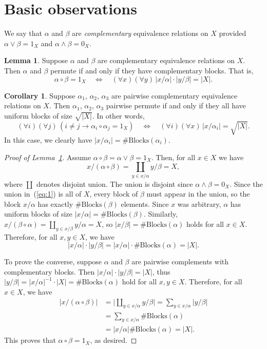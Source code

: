 \documentclass{amsart}
\theoremstyle{plain}
\theoremstyle{definition}
\newtheorem{corollary}{Corollary}
\newtheorem{lemma}{Lemma}
\theoremstyle{definition}
\numberwithin{equation}{section}
\newcommand{\<}{\ensuremath{\langle}}
\renewcommand{\>}{\ensuremath{\rangle}}
\newcommand{\meet}{\ensuremath{\wedge}}
\newcommand{\join}{\ensuremath{\vee}}
\newcommand{\nb}[1]{\ensuremath{\#\mathrm{Blocks}(#1)}}
\begin{document}
\section{Basic observations}
We say that $\alpha$ and $\beta$ are \emph{complementary} equivalence relations
on $X$ provided $\alpha \join \beta = 1_X$ and $\alpha \meet \beta = 0_X$.
\begin{lemma}
\label{lem:1}
Suppose $\alpha$ and $\beta$ are complementary equivalence relations on
$X$. Then $\alpha$ and $\beta$ permute if and only if they have complementary
blocks.  That is,
\[
\alpha \circ \beta =1_X \quad \Longleftrightarrow \quad (\forall x)(\forall y)\,
|x/\alpha|\cdot |y/\beta| = |X|.
\]
\end{lemma}
\begin{corollary}
\label{cor:1}
Suppose $\alpha_1$, $\alpha_2$, $\alpha_3$ are pairwise complementary
equivalence relations on $X$. Then  $\alpha_1$, $\alpha_2$, $\alpha_3$
pairwise permute if and only if they all have uniform blocks of size 
$\sqrt{|X|}$.  In other words,
\[
(\forall i)(\forall j) \, (i\neq j \longrightarrow \alpha_i \circ \alpha_j = 1_X)
\quad \Longleftrightarrow \quad (\forall i)(\forall x) \, |x/\alpha_i| =
\sqrt{|X|}.
\]
In this case, we clearly have $|x/\alpha_i| =\nb{\alpha_i}$. 
\end{corollary}
\begin{proof}[Proof of Lemma~\ref{lem:1}]
  Assume $\alpha \circ \beta = \alpha \join \beta = 1_X$. Then, for all $x\in X$
  we have
  \begin{equation}
    \label{eq:1}
x/(\alpha\circ \beta) = \coprod_{y \in x/\alpha} y/\beta = X,
  \end{equation}
where $\coprod$ denotes disjoint union.  The union is disjoint since
$\alpha \meet \beta = 0_X$.  Since the union in~(\ref{eq:1}) is all of $X$,
every block of $\beta$ must appear in the union, so the block $x/\alpha$ has
exactly $\nb{\beta}$ elements. Since $x$ was arbitrary, $\alpha$ has uniform
blocks of size $|x/\alpha| =\nb{\beta}$. Similarly, 
$x/(\beta \circ \alpha) = \coprod_{y \in x/\beta} y/\alpha = X$, so 
$|x/\beta| =\nb{\alpha}$ holds for all $x\in X$.  Therefore, 
for all $x, y\in X$, we have
\[
|x/\alpha|\cdot |y/\beta| 
 = |x/\alpha|\cdot \nb{\alpha} = |X|.
\]

To prove the converse, suppose $\alpha$ and $\beta$ are pairwise complements
with complementary blocks.  Then $|x/\alpha|\cdot |y/\beta| = |X|$, 
thus $|y/\beta| = |x/\alpha|^{-1} \cdot |X|  = \nb{\alpha}$ 
hold for all $x, y \in X$.  Therefore, for all $x\in X$, we have
\begin{align*}
\bigl|x/(\alpha\circ \beta)\bigr| &= \bigl|\coprod_{y\in x/\alpha} y/\beta\bigr|
= \sum_{y \in x/\alpha} |y/\beta|\\
&= \sum_{y \in x/\alpha} \nb{\alpha} \\
&= |x/\alpha|\nb{\alpha} = |X|.
\end{align*}
This proves that $\alpha\circ \beta = 1_X$, as desired.
\end{proof}
\end{document}

